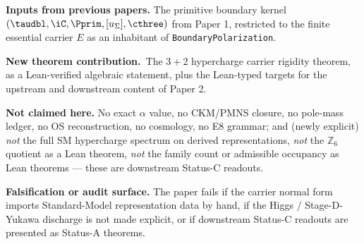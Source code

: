 
\maketitle

\begin{abstract}
This paper proves the algebraic core of TFPT's carrier theorem and, separately, sketches its
Standard-Model packet outlook. The carrier core takes four explicit interfaces --- a carrier
involution $\epscar^2 = \mathbf 1$, a Higgs rank-$2$ interface $\dim E_+ = 2$, a Yukawa Stage-D
trilinear interface $\omega : \Lambda^3 E_- \to K$ with operational contraction predicates, and a
primitive oriented determinant-preserving carrier condition --- and forces the determinant-normalised
$3+2$ hypercharge carrier
\[
Y = -\tfrac13 P_- + \tfrac12 P_+ = \operatorname{diag}\!\left(-\tfrac13,-\tfrac13,-\tfrac13,\tfrac12,\tfrac12\right),
\quad
(q_-, q_+) = (-2, 3),
\quad
\tr_E Y = 0,
\quad
6 Y^2 - Y - \mathbf 1 = \mathbf 0.
\]
The algebraic dependency graph is \emph{formally verified} in Lean 4 (companion note;
\texttt{audit.sh} returns \texttt{AUDIT:~PASS}). The remaining downstream content of TFPT's
Standard-Model packet --- the even exterior spinor packet $S^+ = \Lambda^{\mathrm{even}} E$,
derived representations (duals, exterior powers, tensor products), the $\mathbb Z_6$ quotient
$G_{\mathrm{phys}}$, the family count $N_{\mathrm{fam}} = 3$, the admissible occupancy
$\Omega_{\mathrm{adm}} = 48$, the compact Higgs index $N_\Phi = 1$, and the abelian index
coefficient $b_1 = 41/10$ --- is presented as a \emph{conditional outlook} downstream of the
carrier core; not as a formalised theorem.
\end{abstract}

\begin{tfptfrontbox}
\textbf{Inputs from previous papers.} The primitive boundary kernel
$(\taudbl,\iC,\Pprim,[u_\Sigma],\cthree)$ from Paper 1, restricted to the finite essential carrier $E$
as an inhabitant of \texttt{BoundaryPolarization}.

\textbf{New theorem contribution.}\ The $3+2$ hypercharge carrier rigidity theorem, as a
Lean-verified algebraic statement, plus the Lean-typed targets for the upstream and downstream
content of Paper 2.

\textbf{Not claimed here.} No exact $\alpha$ value, no CKM/PMNS closure, no pole-mass ledger, no OS
reconstruction, no cosmology, no E8 grammar; and (newly explicit) \emph{not} the full SM hypercharge
spectrum on derived representations, \emph{not} the $\mathbb Z_6$ quotient as a Lean theorem,
\emph{not} the family count or admissible occupancy as Lean theorems --- these are downstream
Status-C readouts.

\textbf{Falsification or audit surface.} The paper fails if the carrier normal form imports
Standard-Model representation data by hand, if the Higgs / Stage-D-Yukawa discharge is not made
explicit, or if downstream Status-C readouts are presented as Status-A theorems.
\end{tfptfrontbox}


